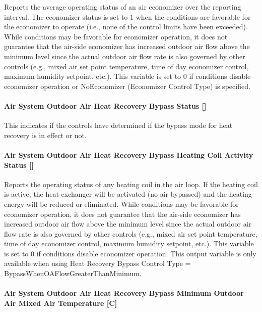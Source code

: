 Reports the average operating status of an air economizer over the reporting interval. The economizer status is set to 1 when the conditions are favorable for the economizer to operate (i.e., none of the control limits have been exceeded). While conditions may be favorable for economizer operation, it does not guarantee that the air-side economizer has increased outdoor air flow above the minimum level since the actual outdoor air flow rate is also governed by other controls (e.g., mixed air set point temperature, time of day economizer control, maximum humidity setpoint, etc.). This variable is set to 0 if conditions disable economizer operation or NoEconomizer (Economizer Control Type) is specified.

\paragraph{Air System Outdoor Air Heat Recovery Bypass Status {[]}}\label{air-system-outdoor-air-heat-recovery-bypass-status}

This indicates if the controls have determined if the bypass mode for heat recovery is in effect or not.

\paragraph{Air System Outdoor Air Heat Recovery Bypass Heating Coil Activity Status {[]}}\label{air-system-outdoor-air-heat-recovery-bypass-heating-coil-activity-status}

Reports the operating status of any heating coil in the air loop. If the heating coil is active, the heat exchanger will be activated (no air bypassed) and the heating energy will be reduced or eliminated. While conditions may be favorable for economizer operation, it does not guarantee that the air-side economizer has increased outdoor air flow above the minimum level since the actual outdoor air flow rate is also governed by other controls (e.g., mixed air set point temperature, time of day economizer control, maximum humidity setpoint, etc.). This variable is set to 0 if conditions disable economizer operation. This output variable is only available when using Heat Recovery Bypass Control Type = BypassWhenOAFlowGreaterThanMinimum.

\paragraph{Air System Outdoor Air Heat Recovery Bypass Minimum Outdoor Air Mixed Air Temperature {[}C{]}}\label{air-system-outdoor-air-heat-recovery-bypass-minimum-outdoor-air-mixed-air-temperature-c}

